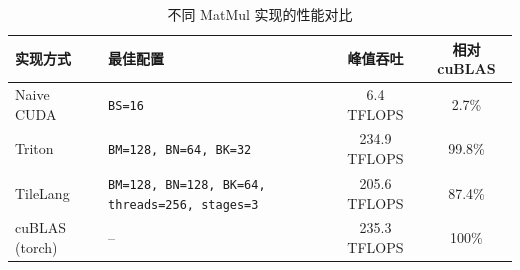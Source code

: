 \documentclass[11pt,a4paper,fontset=none]{ctexart}
\begin{document}
\begin{enumerate}[label=(\alph*)]

\end{enumerate}

\begin{table}[htbp]
\centering
\caption{不同 MatMul 实现的性能对比}
\label{tab:matmul-comparison}
\begin{tabular}{@{}llcc@{}}
\toprule
\textbf{实现方式} & \textbf{最佳配置} & \textbf{峰值吞吐} & \textbf{相对 cuBLAS} \\
\midrule
Naive CUDA   & \texttt{BS=16}                                & 6.4 TFLOPS  & 2.7\%  \\
Triton       & \texttt{BM=128, BN=64, BK=32}                & 234.9 TFLOPS & 99.8\% \\
TileLang     & \texttt{BM=128, BN=128, BK=64, threads=256, stages=3} & 205.6 TFLOPS & 87.4\% \\
cuBLAS (torch) & --                                            & 235.3 TFLOPS & 100\% \\
\bottomrule
\end{tabular}
\end{table}
\end{document}
